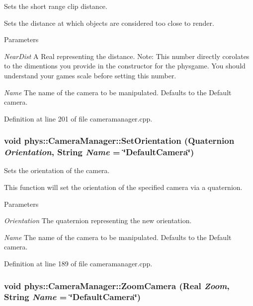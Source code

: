 Sets the short range clip distance. 

Sets the distance at which objects are considered too close to render. 
\begin{DoxyParams}{Parameters}
\item[{\em NearDist}]A Real representing the distance. Note: This number directly corolates to the dimentions you provide in the constructor for the physgame. You should understand your games scale before setting this number. \item[{\em Name}]The name of the camera to be manipulated. Defaults to the Default camera. \end{DoxyParams}


Definition at line 201 of file cameramanager.cpp.

\hypertarget{classphys_1_1CameraManager_a9d0fac66fbc2eb4b7247c9661427afb8}{
\subsubsection[{SetOrientation}]{\setlength{\rightskip}{0pt plus 5cm}void phys::CameraManager::SetOrientation ({\bf Quaternion} {\em Orientation}, \/  {\bf String} {\em Name} = {\ttfamily \char`\"{}DefaultCamera\char`\"{}})}}
\label{d9/d91/classphys_1_1CameraManager_a9d0fac66fbc2eb4b7247c9661427afb8}


Sets the orientation of the camera. 

This function will set the orientation of the specified camera via a quaternion. 
\begin{DoxyParams}{Parameters}
\item[{\em Orientation}]The quaternion representing the new orientation. \item[{\em Name}]The name of the camera to be manipulated. Defaults to the Default camera. \end{DoxyParams}


Definition at line 189 of file cameramanager.cpp.

\hypertarget{classphys_1_1CameraManager_aa5a37dbdd45a53bc3dfd4cfa0a94bd42}{
\subsubsection[{ZoomCamera}]{\setlength{\rightskip}{0pt plus 5cm}void phys::CameraManager::ZoomCamera ({\bf Real} {\em Zoom}, \/  {\bf String} {\em Name} = {\ttfamily \char`\"{}DefaultCamera\char`\"{}})}}
\label{d9/d91/classphys_1_1CameraManager_aa5a37dbdd45a53bc3dfd4cfa0a94bd42}


